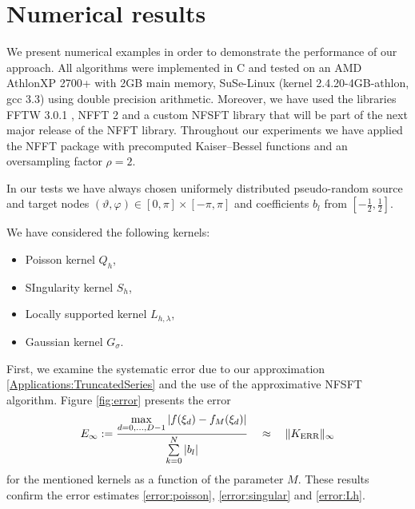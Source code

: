 \documentclass[11pt,a4paper,twoside,bibtotoc]{scrartcl}
\theoremstyle{plain}
\theoremstyle{definition}
\theoremstyle{remark}
\newcommand{\fun}[2]{\ensuremath{#1{\hspace{-0.4ex}}\left(#2\right)}}
\newcommand{\paren}[1]{\ensuremath{\left(#1\right)}}
\numberwithin{equation}{section}
\numberwithin{table}{section}
\numberwithin{figure}{section}
\begin{document}
\section{Numerical results}

We present numerical examples in order to demonstrate the performance of
our approach. All algorithms were implemented in C and tested on an 
AMD Athlon\texttrademark XP 2700+ with 2GB main memory, SuSe-Linux 
(kernel 2.4.20-4GB-athlon, gcc 3.3) using double precision arithmetic. 
Moreover, we have used the libraries FFTW 3.0.1 \cite{fftw}, NFFT 2
\cite{kupo02C} and a custom NFSFT library that will be part of the next 
major release of the NFFT library. Throughout our experiments we have 
applied the NFFT package \cite{kupo02C} with precomputed Kaiser--Bessel 
functions and an oversampling factor $\rho=2$.

In our tests we have always chosen uniformely distributed pseudo-random 
source and target nodes 
$\paren{\vartheta,\varphi} \in [0,\pi] \times [-\pi,\pi]$ and 
coefficients $b_l$ from $\left[-\frac{1}{2},\frac{1}{2}\right]$.

We have considered the following kernels:

\begin{itemize}
  \item Poisson kernel $Q_{h}$,
  \item SIngularity kernel $S_{h}$,
  \item Locally supported kernel $L_{h,\lambda}$,
  \item Gaussian kernel $G_{\sigma}$.
\end{itemize}


First, we examine the systematic error due to our approximation 
\eqref{Applications:TruncatedSeries} and the use of the 
approximative NFSFT algorithm. Figure \ref{fig:error} presents 
the error
\[
  E_{\infty}:=
  \frac{\max\limits_{d=0,\ldots,D-1}\left|\fun{f}{\xi_{d}}-
  \fun{f_{M}}{\xi_{d}}\right|}{\sum\limits_{k=0}^N 
  |b_l|} \quad \approx \quad \|K_{\text{ERR}}\|_{\infty}
\]
for the mentioned kernels as a function of the parameter $M$.
These results confirm the error estimates \eqref{error:poisson},
\eqref{error:singular} and \eqref{error:Lh}.
\end{document}

